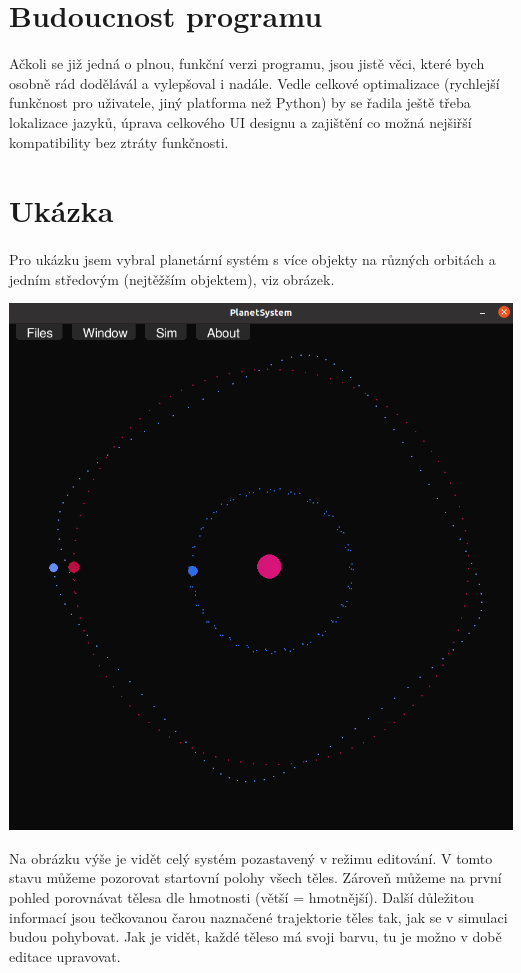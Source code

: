 \documentclass[a4paper, 12pt]{article}
\begin{document}
\section{Budoucnost programu}
Ačkoli se již jedná o plnou, funkční verzi programu, jsou jistě věci, které
bych osobně rád dodělávál a vylepšoval i nadále. Vedle celkové optimalizace
(rychlejší funkčnost pro uživatele, jiný platforma než Python) by se řadila
ještě třeba lokalizace jazyků, úprava celkového UI designu a zajištění co možná
nejšiřší kompatibility bez ztráty funkčnosti. 

\newpage
\section{Ukázka}
\paragraph{}
Pro ukázku jsem vybral planetární systém s více objekty na různých orbitách a
jedním středovým (nejtěžším objektem), viz obrázek.

\begin{center}
\includegraphics[width=0.9\linewidth]{pics/p4_crop.png}
\end{center}

Na obrázku výše je vidět celý systém pozastavený v režimu editování. V tomto
stavu můžeme pozorovat startovní polohy všech těles. Zároveň můžeme na první
pohled porovnávat tělesa dle hmotnosti (větší = hmotnější). Další důležitou
informací jsou tečkovanou čarou naznačené trajektorie těles tak, jak se v
simulaci budou pohybovat. Jak je vidět, každé těleso má svoji barvu, tu je
možno v době editace upravovat.
\pagebreak
\end{document}
